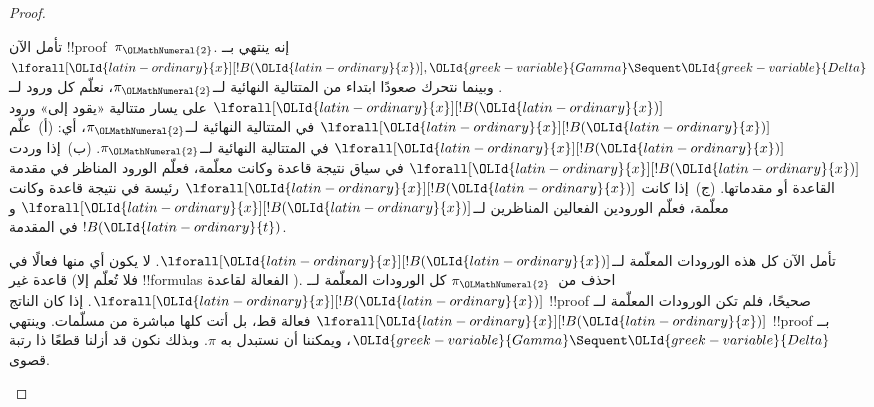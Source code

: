 \documentclass[../../../include/open-logic-section]{subfiles}
\begin{document}
\begin{proof}
\begin{enumerate}
  تأمل الآن !!{proof}~$\pi_\OLMathNumeral{2}$. إنه ينتهي بــ$\lforall[\OLId{latin-ordinary}{x}][!B(\OLId{latin-ordinary}{x})],
  \OLId{greek-variable}{Gamma} \Sequent \OLId{greek-variable}{Delta}$. وبينما نتحرك صعودًا ابتداء من المتتالية النهائية
  لــ$\pi_\OLMathNumeral{2}$، نعلّم كل ورود لــ$\lforall[\OLId{latin-ordinary}{x}][!B(\OLId{latin-ordinary}{x})]$ على يسار متتالية «يقود
  إلى» ورود $\lforall[\OLId{latin-ordinary}{x}][!B(\OLId{latin-ordinary}{x})]$ في المتتالية النهائية لــ$\pi_\OLMathNumeral{2}$، أي:
  (أ)~علّم $\lforall[\OLId{latin-ordinary}{x}][!B(\OLId{latin-ordinary}{x})]$ في المتتالية النهائية لــ$\pi_\OLMathNumeral{2}$.
  (ب)~إذا وردت $\lforall[\OLId{latin-ordinary}{x}][!B(\OLId{latin-ordinary}{x})]$ في سياق نتيجة قاعدة وكانت معلّمة،
  فعلّم الورود المناظر في مقدمة القاعدة أو مقدماتها. (ج)~إذا كانت
  $\lforall[\OLId{latin-ordinary}{x}][!B(\OLId{latin-ordinary}{x})]$ رئيسة في نتيجة قاعدة \LeftR{\lforall} وكانت معلّمة،
  فعلّم الورودين الفعالين المناظرين لــ$\lforall[\OLId{latin-ordinary}{x}][!B(\OLId{latin-ordinary}{x})]$ و$!B(\OLId{latin-ordinary}{t})$ في
  المقدمة.

  تأمل الآن كل هذه الورودات المعلّمة لــ$\lforall[\OLId{latin-ordinary}{x}][!B(\OLId{latin-ordinary}{x})]$. لا يكون أي
  منها فعالًا في قاعدة غير \LeftR{\lforall} (فلا تُعلّم إلا !!{formula}s
  الفعالة لقاعدة \LeftR{\lforall}). احذف من~$\pi_\OLMathNumeral{2}$ كل الورودات المعلّمة
  لــ$\lforall[\OLId{latin-ordinary}{x}][!B(\OLId{latin-ordinary}{x})]$.
  إذا كان الناتج !!{proof} صحيحًا، فلم تكن الورودات المعلّمة لــ
  $\lforall[\OLId{latin-ordinary}{x}][!B(\OLId{latin-ordinary}{x})]$ فعالة قط، بل أتت كلها مباشرة من مسلّمات. وينتهي
  !!{proof} بــ$\OLId{greek-variable}{Gamma} \Sequent \OLId{greek-variable}{Delta}$، ويمكننا أن نستبدل به $\pi$.
  وبذلك نكون قد أزلنا قطعًا ذا رتبة قصوى.


\end{enumerate}
\end{proof}
\end{document}

